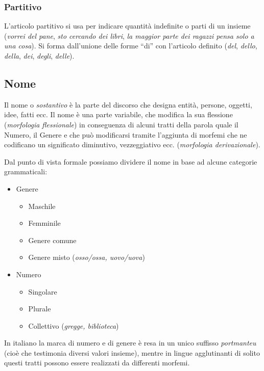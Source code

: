 \documentclass[a4paper,twoside,11pt,chapterprefix=false,bibliography=totocnumbered,listof=flat]{scrbook}
\providecommand{\tightlist}{%
  \setlength{\itemsep}{0pt}\setlength{\parskip}{0pt}}
\begin{document}
\subsubsection{Partitivo}\label{partitivo}

L'articolo partitivo si usa per indicare quantità indefinite o parti di
un insieme (\emph{vorrei del pane}, \emph{sto cercando dei libri},
\emph{la maggior parte dei ragazzi pensa solo a una cosa}). Si forma
dall'unione delle forme \enquote{di} con l'articolo definito
(\emph{del}, \emph{dello}, \emph{della}, \emph{dei}, \emph{degli},
\emph{delle}).

\subsection{Nome}\label{nome}

Il nome o \emph{sostantivo} è la parte del discorso che designa entità,
persone, oggetti, idee, fatti ecc. Il nome è una parte variabile, che
modifica la sua flessione (\emph{morfologia flessionale}) in conseguenza
di alcuni tratti della parola quale il Numero, il Genere e che può
modificarsi tramite l'aggiunta di morfemi che ne codificano un
significato diminutivo, vezzeggiativo ecc. (\emph{morfologia
derivazionale}).

Dal punto di vista formale possiamo dividere il nome in base ad alcune
categorie grammaticali:

\begin{itemize}
\tightlist
\item
  Genere

  \begin{itemize}
  \tightlist
  \item
    Maschile
  \item
    Femminile
  \item
    Genere comune
  \item
    Genere misto (\emph{osso/ossa, uovo/uova})
  \end{itemize}
\item
  Numero

  \begin{itemize}
  \tightlist
  \item
    Singolare
  \item
    Plurale
  \item
    Collettivo (\emph{gregge, biblioteca})
  \end{itemize}
\end{itemize}

In italiano la marca di numero e di genere è resa in un unico suffisso
\emph{portmanteu} (cioè che testimonia diversi valori insieme), mentre
in lingue agglutinanti di solito questi tratti possono essere realizzati
da differenti morfemi.
\end{document}
